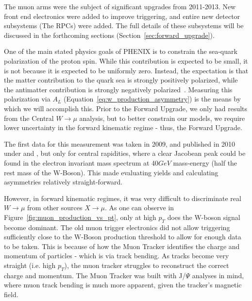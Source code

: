 The muon arms were the subject of significant upgrades from 2011-2013.
New front end electronics were added to improve triggering, and entire new
detector subsystems (The RPCs) were added. The full details of these subsystems
will be discussed in the forthcoming sections (Section~\ref{sec:forward_upgrade}).


One of the main stated physics goals of PHENIX is to constrain the sea-quark
polarization of the proton spin. While this contribution is
expected to be small, it is not because it is expected to be uniformly zero.
Instead, the expectation is that the matter contribution to the quark sea is
strongly positively polarized, while the antimatter contribution is strongly
negatively polarized~\cite{Aidala2005}. Measuring this polarization via $A_L$
(Equation~\ref{eq:w_production_asymmetry}) is the means by which we will
accomplish this. Prior to the Forward Upgrade, we only had results from the
Central $W\rightarrow\mu$ analysis, but to better constrain our models, we
require lower uncertainty in the forward kinematic regime - thus, the Forward
Upgrade.

The first data for this measurement was taken in 2009, and published in 2010
under \cite{Adare2010} and \cite{Okada2010}, but only for central rapidities,
where a clear Jacobean peak could be found in the electron invariant mass
spectrum at 40$GeV$ mass-energy (half the rest mass of the W-Boson). This made
evaluating yields and calculating asymmetries relatively straight-forward. 

However, in forward kinematic regimes, it was very difficult to discriminate
real $W\rightarrow\mu$ from other sources $X\rightarrow\mu$. As one can observe
in Figure~\ref{fig:muon_production_vs_pt}, only at high $p_T$ does the W-boson
signal become dominant. The old muon trigger electronics did not allow
triggering sufficiently close to the W-Boson production threshold to allow for
enough data to be taken. This is because of how the Muon Tracker identifies the
charge and momentum of particles - which is via track bending. As tracks become
very straight (i.e. high $p_T$), the muon tracker struggles to reconstruct the
correct charge and momentum. The Muon Tracker was built with J/$\Psi$ analyses
in mind, where muon track bending is much more apparent, given the tracker's
magnetic field.

